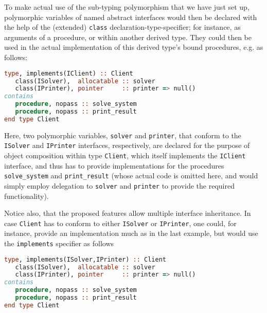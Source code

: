 \documentclass[11pt,oneside]{article}
\begin{document}
To make actual use of the sub-typing polymorphism that we have just
set up, polymorphic variables of named abstract interfaces would then
be declared with the help of the (extended) \texttt{class}
declaration-type-specifier; for instance, as arguments of a procedure,
or within another derived type. They could then be used in the actual
implementation of this derived type's bound procedures, e.g. as
follows:
\begin{lstlisting}[language=Fortran]
type, implements(IClient) :: Client
   class(ISolver),  allocatable :: solver
   class(IPrinter), pointer     :: printer => null()
contains
   procedure, nopass :: solve_system
   procedure, nopass :: print_result
end type Client
\end{lstlisting}
Here, two polymorphic variables, \texttt{solver} and \texttt{printer},
that conform to the \texttt{ISolver} and \texttt{IPrinter} interfaces,
respectively, are declared for the purpose of object composition
within type \texttt{Client}, which itself implements the
\texttt{IClient} interface, and thus has to provide implementations
for the procedures \texttt{solve\_system} and \texttt{print\_result}
(whose actual code is omitted here, and would simply employ delegation
to \texttt{solver} and \texttt{printer} to provide the required
functionality).

Notice also, that the proposed features allow multiple interface
inheritance. In case \texttt{Client} has to conform to either
\texttt{ISolver} or \texttt{IPrinter}, one could, for instance,
provide an implementation much as in the last example, but would use
the \texttt{implements} specifier as follows
\begin{lstlisting}[language=Fortran]
type, implements(ISolver,IPrinter) :: Client
   class(ISolver),  allocatable :: solver
   class(IPrinter), pointer     :: printer => null()
contains
   procedure, nopass :: solve_system
   procedure, nopass :: print_result
end type Client
\end{lstlisting}
\end{document}
